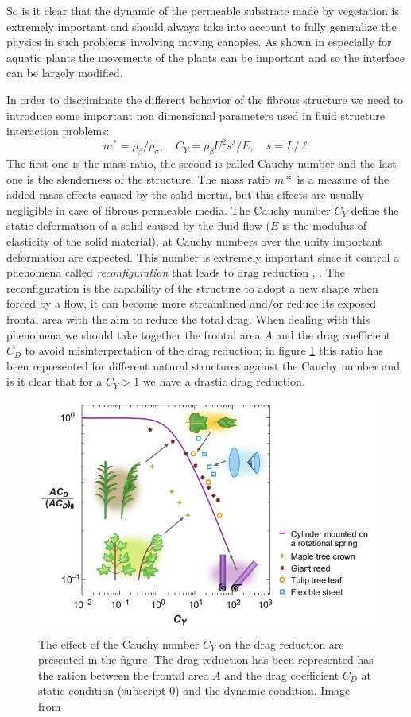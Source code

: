 So is it clear that the dynamic of the permeable substrate made by vegetation is extremely important and should always take into account to fully generalize the physics in such problems involving moving canopies.
As shown in \citet{nepf2012flow} especially for aquatic plants the movements of the plants can be important and so the interface can be largely modified.

In order to discriminate the different behavior of the fibrous structure we need to introduce some important non dimensional parameters used in fluid structure interaction problems:
$$ m^* = \rho_{\beta} / \rho_{\sigma}, \quad C_Y= \rho_{\beta} U^2 s^3 / E, \quad s = L/\ell $$
The first one is the mass ratio, the second is called Cauchy number and the last one is the slenderness of the structure.
The mass ratio $m*$ is a measure of the added mass effects caused by the solid inertia, but this effects are usually negligible in case of fibrous permeable media.
The Cauchy number $C_Y$ define the static deformation of a solid caused by the fluid flow ($E$ is the modulus of elasticity of the solid material), at Cauchy numbers over the unity important deformation are expected.
This number is extremely important since it control a phenomena called \textit{reconfiguration} that leads to drag reduction \citet{gosselin2011drag}, \citet{alvarado2017nature}.
The reconfiguration is the capability of the structure to adopt a new shape when forced by a flow, it can become more streamlined and/or reduce its exposed frontal area with the aim to reduce the total drag.
When dealing with this phenomena we should take together the frontal area $A$ and the drag coefficient $C_D$ to avoid misinterpretation of the drag reduction; in figure \ref{fig:cycd} this ratio has been represented for different natural structures against the Cauchy number and is it clear that for a $C_Y>1$ we have a drastic drag reduction.

\begin{figure}[h]
	\centering
	\includegraphics[width=0.7\linewidth]{chapter_1/cy_cd}
	\caption{The effect of the Cauchy number $C_Y$ on the drag reduction are presented in the figure. The drag reduction has been represented has the ration between the frontal area $A$ and the drag coefficient $C_D$ at static condition (subscript $0$) and the dynamic condition. Image from \citet{de2008effects}}
	\label{fig:cycd}
\end{figure}

